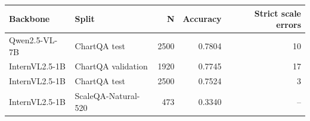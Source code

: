 \begin{tabular}{llrrr}
\toprule
Backbone & Split & N & Accuracy & Strict scale errors \\
\midrule
Qwen2.5-VL-7B & ChartQA test & 2500 & 0.7804 & 10 \\
InternVL2.5-1B & ChartQA validation & 1920 & 0.7745 & 17 \\
InternVL2.5-1B & ChartQA test & 2500 & 0.7524 & 3 \\
InternVL2.5-1B & ScaleQA-Natural-520 & 473 & 0.3340 & -- \\
\bottomrule
\end{tabular}
